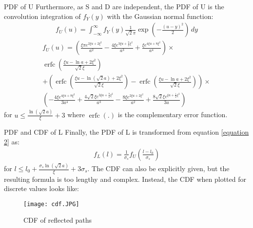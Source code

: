\documentclass{beamer}
\providecommand{\brak}[1]{\ensuremath{\left(#1\right)}}
\DeclareMathOperator{\erfc}{erfc}
\begin{document}
\begin{frame}{PDF of U}
Furthermore, as S and D are independent, the PDF of U is the convolution integration of $f_Y(y)$ with the Gaussian normal function:
\begin{align}
    f_U(u) = \int_{-\infty}^{\infty}f_Y(y)\frac{1}{\sqrt{2}\pi}\exp{\brak{-\frac{(u-y)^2}{2}}} \,dy
\end{align}
\begin{multline}
    f_U(u) = \brak{\frac{\xi \pi e^{2\xi u + 2\xi^2}}{a^2} - \frac{4\xi e^{3\xi u + \frac{9}{2}\xi^2}}{a^3} + \frac{\xi e^{4\xi u+8\xi^2}}{a^4}} \times 
    \\\erfc\brak{\frac{\xi u-\ln{a} + 2\xi^2}{\sqrt{2}\xi}} 
    \\ +\brak{\erfc\brak{\frac{\xi u-\ln{(\sqrt{2}a)} + 2\xi^2}{\sqrt{2}\xi}} 
    - \erfc \brak{\frac{\xi u-\ln{a} + 2\xi^2}{\sqrt{2}\xi}}} \times 
    \\ \brak{-\frac{4\xi e^{4\xi u + 8\xi ^2}}{3a^4} + \frac{4\sqrt{2}\xi e^{3\xi u + \frac{9}{2}\xi^2}}{a^3} - \frac{8\xi e^{2\xi u +2\xi^2}}{a^2} + \frac{8\sqrt{2}\xi e^{\xi u + \frac{1}{2}\xi^2}}{3a}} \label{equation 2}
\end{multline}
for $u\leq \frac{\ln{(\sqrt{2}a)}}{\xi} + 3$ where $\erfc(.)$ is the complementary error function.
\end{frame}
\begin{frame}{PDF and CDF of L}
Finally, the PDF of L is transformed from equation \eqref{equation 2} as:
\begin{align}
    f_L(l) = \frac{1}{\sigma_s}f_U\brak{\frac{l-l_0}{\sigma_s}}
\end{align}
for $l\leq l_0 + \frac{\sigma_s\ln{(\sqrt{2}a)}}{\xi} + 3\sigma_s$. The CDF can also be explicitly given, but the resulting formula is too lengthy and complex. Instead, the CDF when plotted for discrete values looks like: 
\begin{figure}[!ht]
\centering
\texttt{[image: cdf.JPG]}
\caption{CDF of reflected paths}
\label{image 4}
\end{figure}
\end{frame}
\end{document}
